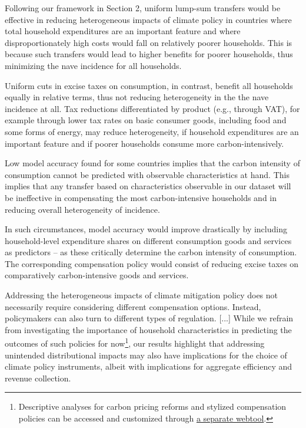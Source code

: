 \documentclass[11pt]{article}
\begin{document}
\begin{revisionbox}
    Following our framework in Section 2, uniform lump-sum transfers would be effective in reducing heterogeneous impacts of climate policy in countries where total household expenditures are an important feature and where disproportionately high costs would fall on relatively poorer households. This is because such transfers would lead to higher benefits for poorer households, thus minimizing the nave incidence for all households.
\end{revisionbox}

\begin{revisionbox}
    Uniform cuts in excise taxes on consumption, in contrast, benefit all households equally in relative terms, thus not reducing heterogeneity in the the nave incidence at all. Tax reductions differentiated by product (e.g., through VAT), for example through lower tax rates on basic consumer goods, including food and some forms of energy, may reduce heterogeneity, if household expenditures are an important feature and if poorer households consume more carbon-intensively.
\end{revisionbox}

\begin{revisionbox}
    Low model accuracy found for some countries implies that the carbon intensity of consumption cannot be predicted with observable characteristics at hand. This implies that any transfer based on characteristics observable in our dataset will be ineffective in compensating the most carbon-intensive households and in reducing overall heterogeneity of incidence.
\end{revisionbox}

\begin{revisionbox}
    In such circumstances, model accuracy would improve drastically by including household-level expenditure shares on different consumption goods and services as predictors -- as these critically determine the carbon intensity of consumption. The corresponding compensation policy would consist of reducing excise taxes on comparatively carbon-intensive goods and services.
\end{revisionbox}

\begin{revisionbox}
    Addressing the heterogeneous impacts of climate mitigation policy does not necessarily require considering different compensation options. Instead, policymakers can also turn to different types of regulation. [...] While we refrain from investigating the importance of household characteristics in predicting the outcomes of such policies for now\footnote{Descriptive analyses for carbon pricing reforms and stylized compensation policies can be accessed and customized through \href{https://www.cpic-global.net/}{a separate webtool}.}, our results highlight that addressing unintended distributional impacts may also have implications for the choice of climate policy instruments, albeit with implications for aggregate efficiency and revenue collection. 
\end{revisionbox}
\end{document}
